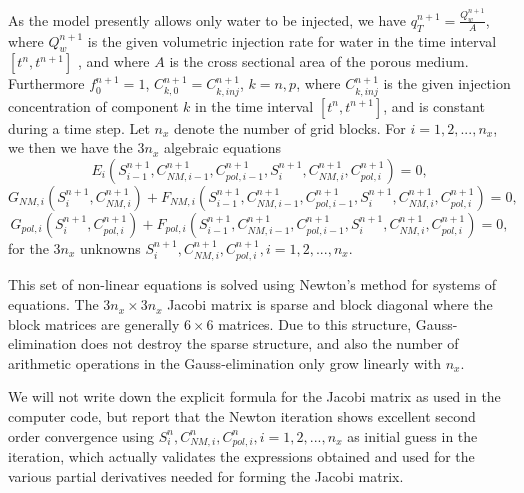 \documentclass[energies,article,submit,moreauthors,pdftex]{Definitions/mdpi}
\begin{document}
As the model presently allows only water to be injected, we have  $q_T^{n+1}=\frac{Q_w^{n+1}}{A}$, where $Q_w^{n+1}$ is the given volumetric injection rate for water in the time interval $\left[t^n,t^{n+1}\right]$ , and where $A$ is the cross sectional area of the porous medium. Furthermore $f^{n+1}_0=1$,  $C^{n+1}_{k,0}=C^{n+1}_{k,inj}$, $k=n,p$, where $C^{n+1}_{k,inj}$ is the given injection concentration of component $k$ in the time interval $\left[t^n,t^{n+1}\right]$, and is constant during a time step. Let $n_x$  denote the number of grid blocks. For $i=1,2,...,n_x$, we then we have the $3n_x$  algebraic equations
\begin{equation}
    E_i \left(S^{n+1}_{i-1}, C^{n+1}_{\textit{NM}, i-1}, C^{n+1}_{pol, i-1}, S^{n+1}_{i}, C^{n+1}_{\textit{NM}, i}, C^{n+1}_{pol, i}\right)  = 0, %
\end{equation}
\begin{equation}
    G_{\textit{NM}, i} \left(S^{n+1}_{i}, C^{n+1}_{\textit{NM}, i}\right)+ F_{\textit{NM}, i} \left(S^{n+1}_{i-1}, C^{n+1}_{\textit{NM}, i-1}, C^{n+1}_{pol, i-1}, S^{n+1}_{i}, C^{n+1}_{\textit{NM}, i}, C^{n+1}_{pol, i}\right) =0, %
\end{equation}
\begin{equation}
    G_{\textit{pol}, i} \left(S^{n+1}_{i}, C^{n+1}_{\textit{pol}, i}\right)+ F_{\textit{pol}, i} \left(S^{n+1}_{i-1}, C^{n+1}_{\textit{NM}, i-1}, C^{n+1}_{pol, i-1}, S^{n+1}_{i}, C^{n+1}_{\textit{NM}, i}, C^{n+1}_{pol, i}\right) =0, %
\end{equation}
for the $3n_x$ unknowns $S^{n+1}_{i}, C^{n+1}_{\textit{NM}, i}, C^{n+1}_{pol, i}, i=1,2,...,n_x$.

This set of non-linear equations is solved using Newton's method for systems of equations. The $3n_x \times 3n_x$   Jacobi matrix is sparse and block diagonal where the block matrices are generally $6\times6$  matrices. Due to this structure, Gauss-elimination does not destroy the sparse structure, and also the number of arithmetic operations in the Gauss-elimination only grow linearly with $n_x$. 

We will not write down the explicit formula for the Jacobi matrix as used in the computer code, but report that the Newton iteration shows excellent second order convergence using  $S^{n}_{i}, C^{n}_{\textit{NM}, i}, C^{n}_{pol, i}, i=1,2,...,n_x$   as initial guess in the iteration, which actually validates the expressions obtained and used for the various partial derivatives needed for forming the Jacobi matrix.
\end{document}
